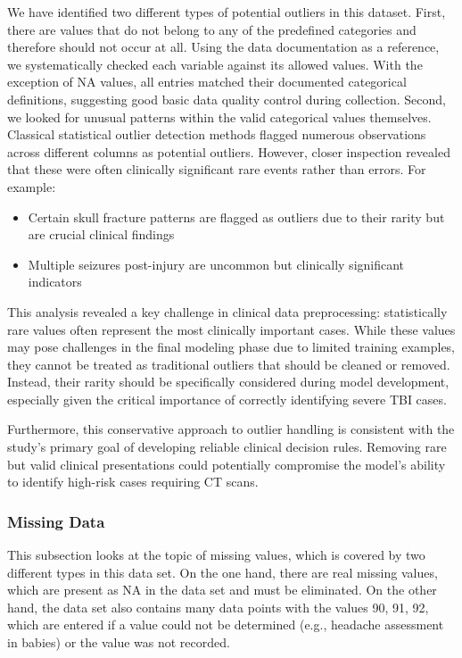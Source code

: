 \documentclass[10pt,letterpaper]{article}
\begin{document}
We have identified two different types of potential outliers in this dataset. First, there are values that do not belong to any of the predefined categories and therefore should not occur at all. Using the data documentation as a reference, we systematically checked each variable against its allowed values. With the exception of NA values, all entries matched their documented categorical definitions, suggesting good basic data quality control during collection. Second, we looked for unusual patterns within the valid categorical values themselves. Classical statistical outlier detection methods flagged numerous observations across different columns as potential outliers. However, closer inspection revealed that these were often clinically significant rare events rather than errors. For example:

\begin{itemize}
\item Certain skull fracture patterns are flagged as outliers due to their rarity but are crucial clinical findings
\item Multiple seizures post-injury are uncommon but clinically significant indicators
\end{itemize}

This analysis revealed a key challenge in clinical data preprocessing: statistically rare values often represent the most clinically important cases. While these values may pose challenges in the final modeling phase due to limited training examples, they cannot be treated as traditional outliers that should be cleaned or removed. Instead, their rarity should be specifically considered during model development, especially given the critical importance of correctly identifying severe TBI cases.

Furthermore, this conservative approach to outlier handling is consistent with the study's primary goal of developing reliable clinical decision rules. Removing rare but valid clinical presentations could potentially compromise the model's ability to identify high-risk cases requiring CT scans.

\subsubsection{Missing Data}
This subsection looks at the topic of missing values, which is covered by two different types in this data set. On the one hand, there are real missing values, which are present as NA in the data set and must be eliminated. On the other hand, the data set also contains many data points with the values 90, 91, 92, which are entered if a value could not be determined (e.g., headache assessment in babies) or the value was not recorded.
\end{document}
